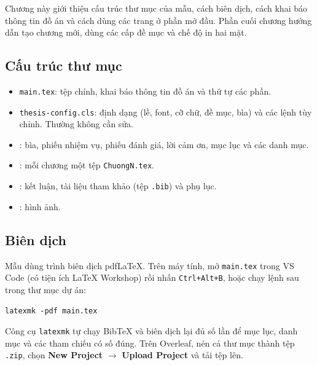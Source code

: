 Chương này giới thiệu cấu trúc thư mục của mẫu, cách biên dịch, cách khai báo thông tin đồ án và cách dùng các trang ở phần mở đầu. Phần cuối chương hướng dẫn tạo chương mới, dùng các cấp đề mục và chế độ in hai mặt.

\subsection{Cấu trúc thư mục}
\begin{itemize}
    \item \texttt{main.tex}: tệp chính, khai báo thông tin đồ án và thứ tự các phần.
    \item \texttt{thesis-config.cls}: định dạng (lề, font, cỡ chữ, đề mục, bìa) và các lệnh tùy chỉnh. Thường không cần sửa.
    \item {}: bìa, phiếu nhiệm vụ, phiếu đánh giá, lời cảm ơn, mục lục và các danh mục.
    \item {}: mỗi chương một tệp \texttt{ChuongN.tex}.
    \item {}: kết luận, tài liệu tham khảo (tệp \texttt{.bib}) và phụ lục.
    \item {}: hình ảnh.
\end{itemize}

\subsection{Biên dịch}
Mẫu dùng trình biên dịch pdfLaTeX. Trên máy tính, mở \texttt{main.tex} trong VS Code (có tiện ích LaTeX Workshop) rồi nhấn \texttt{Ctrl+Alt+B}, hoặc chạy lệnh sau trong thư mục dự án:
\begin{verbatim}
latexmk -pdf main.tex
\end{verbatim}
Công cụ \texttt{latexmk} tự chạy BibTeX và biên dịch lại đủ số lần để mục lục, danh mục và các tham chiếu có số đúng. Trên Overleaf, nén cả thư mục thành tệp \texttt{.zip}, chọn \textbf{New Project} $\rightarrow$ \textbf{Upload Project} và tải tệp lên.

